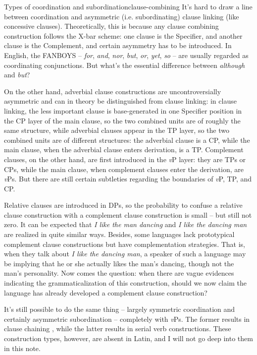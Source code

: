 \documentclass[a4paper, oneside]{report}
\newcommand{\form}[1]{\emph{#1}}
\newcommand{\vP}{\textit{v}P}
\begin{document}
\begin{theorybox}{Types of coordination and subordination}{clause-combining}
    It's hard to draw a line between coordination and asymmetric (i.e. subordinating) clause linking 
    (like concessive clauses).
    Theoretically, this is because any clause combining construction follows the X-bar scheme:
    one clause is the Specifier, 
    and another clause is the Complement,
    and certain asymmetry has to be introduced.
    In English, the FANBOYS 
    -- \form{for}, \form{and}, \form{nor}, \form{but}, 
    \form{or}, \form{yet}, \form{so} -- are usually regarded as coordinating conjunctions.
    But what's the essential difference between \form{although} and \form{but}?

    On the other hand, adverbial clause constructions 
    are uncontroversially asymmetric and can in theory be distinguished from clause linking:
    in clause linking, the less important clause 
    is base-generated in one Specifier position in the CP layer of the main clause,
    so the two combined units are of roughly the same structure,
    while adverbial clauses appear in the TP layer,
    so the two combined units are of different structures:
    the adverbial clause is a CP,
    while the main clause, when the adverbial clause enters derivation,
    is a TP.
    Complement clauses, on the other hand, are first introduced in the \vP{} layer:
    they are TPs or CPs,
    while the main clause, when complement clauses enter the derivation,
    are \vP s.
    But there are still certain subtleties regarding the boundaries of \vP{}, TP, and CP.

    Relative clauses are introduced in DPs, 
    so the probability to confuse a relative clause construction 
    with a complement clause construction is small -- but still not zero.
    It can be expected that \form{I like the man dancing} and \form{I like the dancing man} 
    are realized in quite similar ways.
    Besides, some languages lack prototypical complement clause constructions 
    but have complementation strategies.
    That is, when they talk about \form{I like the dancing man},
    a speaker of such a language may be implying that he or she actually likes the man's dancing,
    though not the man's personality.
    Now comes the question:
    when there are vague evidences indicating the grammaticalization of this construction,
    should we now claim the language has already developed a complement clause construction?

    It's still possible to do the same thing 
    -- largely symmetric coordination and certainly asymmetric subordination -- 
    completely with \vP s.
    The former results in clause chaining \citep{nonato2014clause},
    while the latter results in serial verb constructions.
    These construction types, however, are absent in Latin, and I will not go deep into them in this note.
\end{theorybox}
\end{document}
